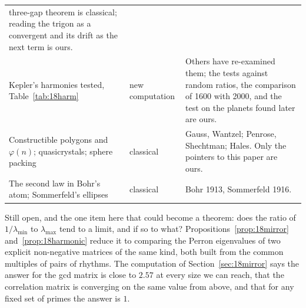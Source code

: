 \begin{table}[ht]
\begin{tabular}{p{}p{}p{}}
three-gap theorem is classical; reading the trigon as a convergent and its drift as the next term is ours.\\
Kepler's harmonies tested, Table~\ref{tab:18harm} & new computation & Others have re-examined them; the
tests against random ratios, the comparison of 1600 with 2000, and the test on the planets found later
are ours.\\
Constructible polygons and $\varphi(n)$; quasicrystals; sphere packing & classical & Gauss, Wantzel;
Penrose, Shechtman; Hales. Only the pointers to this paper are ours.\\
The second law in Bohr's atom; Sommerfeld's ellipses & classical & Bohr 1913, Sommerfeld 1916.\\
\hline
\end{tabular}
\end{table}

Still open, and the one item here that could become a theorem: does the ratio of $1/\lambda_{\min}$ to
$\lambda_{\max}$ tend to a limit, and if so to what? Propositions~\ref{prop:18mirror}
and~\ref{prop:18harmonic} reduce it to comparing the Perron eigenvalues of two explicit non-negative
matrices of the same kind, both built from the common multiples of pairs of rhythms. The computation of
Section~\ref{sec:18mirror} says the answer for the gcd matrix is close to $2.57$ at every size we can
reach, that the correlation matrix is converging on the same value from above, and that for any fixed
set of primes the answer is $1$.
